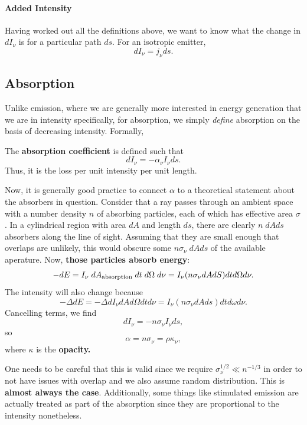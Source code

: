 \paragraph{Added Intensity}
Having worked out all the definitions above, we want to know what the change in $dI_\nu$ is for a particular path $ds$. For an isotropic emitter,
\begin{equation}
\label{eq:emit_coeff}
    \boxed{
dI_\nu = j_\nu ds.
}
\end{equation}

\subsection{Absorption}
Unlike emission, where we are generally more interested in energy generation that we are in intensity specifically, for absorption, we simply \textit{define} absorption on the basis of decreasing intensity. Formally,
\vspace{0.5cm}
\begin{definition}
The \textbf{absorption coefficient} is defined such that
\begin{equation}
\label{eq:absorb_coef}
\boxed{
    dI_\nu = -\alpha_\nu I_\nu ds.
    }
\end{equation}
Thus, it is the loss per unit intensity per unit length. 
\end{definition}
\vspace{0.5cm}
Now, it is generally good practice to connect $\alpha$ to a theoretical statement about the absorbers in question. Consider that a ray passes through an ambient space with a number density $n$ of absorbing particles, each of which has effective area $\sigma$. In a cylindrical region with area $dA$ and length $ds$, there are clearly $n \;dAds$ absorbers along the line of sight. Assuming that they are small enough that overlaps are unlikely, this would obscure some $n \sigma_\nu \; dAds$ of the available aperature. Now, \textbf{those particles absorb energy}:
\[
- dE = I_\nu \; dA_{\rm absorption}\;dt\;d\Omega\;d\nu = I_\nu (n \sigma_\nu dA dS) dt d\Omega d\nu.
\]
The intensity will also change because 
\[
-\Delta dE = - \Delta dI_\nu dA d\Omega dt d\nu = I_\nu (n\sigma_\nu dAds) dtd\omega d\nu.
\]
Cancelling terms, we find
\[
dI_\nu = -n\sigma_\nu I_\nu ds,
\]
so
\[
\boxed{
\alpha=n\sigma_\nu = \rho \kappa_\nu,
}
\]
where $\kappa$ is the \textbf{opacity.}
\begin{remark}
    One needs to be careful that this is valid since we require $\sigma_\nu^{1/2} \ll n^{-1/3}$ in order to not have issues with overlap and we also assume random distribution. This is \textbf{almost always the case}. Additionally, some things like stimulated emission are actually treated as part of the absorption since they are proportional to the intensity nonetheless.
\end{remark}
